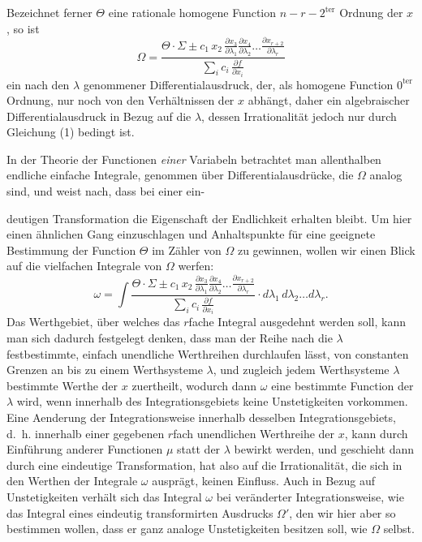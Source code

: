\documentclass{article}
\begin{document}
Bezeichnet ferner $\Theta$ eine rationale homogene Function $n - r - 2^{\text{ter}}$ Ordnung der $x$, so ist
\[
\Omega = \frac{\Theta \cdot \Sigma \pm c_1\, x_2\, \frac{\partial x_3}{\partial \lambda_1} \frac{\partial x_4}{\partial \lambda_2} \dots \frac{\partial x_{r+2}}{\partial \lambda_r}}{\displaystyle\sum_i c_i\, \frac{\partial f}{\partial x_i}}
\]
ein nach den $\lambda$ genommener Differentialausdruck, der, als homogene Function $0^{\text{ter}}$ Ordnung, nur noch von den Verhältnissen der $x$ abhängt, daher ein algebraischer Differentialausdruck in Bezug auf die $\lambda$, dessen Irrationalität jedoch nur durch Gleichung (1) bedingt ist.

In der Theorie der Functionen \emph{einer} Variabeln betrachtet man allenthalben endliche einfache Integrale, genommen über Differentialausdrücke, die $\Omega$ analog sind, und weist nach, dass bei einer ein-

deutigen Transformation die Eigenschaft der Endlichkeit erhalten bleibt. Um hier einen ähnlichen Gang einzuschlagen und Anhaltspunkte für eine geeignete Bestimmung der Function $\Theta$ im Zähler von $\Omega$ zu gewinnen, wollen wir einen Blick auf die vielfachen Integrale von $\Omega$ werfen:
\[
\omega = \int \frac{\Theta \cdot \Sigma \pm c_1\, x_2\, \frac{\partial x_3}{\partial \lambda_1} \frac{\partial x_4}{\partial \lambda_2} \dots \frac{\partial x_{r+2}}{\partial \lambda_r}}{\displaystyle\sum_i c_i\, \frac{\partial f}{\partial x_i}} \cdot d\lambda_1\, d\lambda_2 \dots d\lambda_r .
\]
Das Werthgebiet, über welches das $r$fache Integral ausgedehnt werden soll, kann man sich dadurch festgelegt denken, dass man der Reihe nach die $\lambda$ festbestimmte, einfach unendliche Werthreihen durchlaufen lässt, von constanten Grenzen an bis zu einem Werthsysteme $\lambda$, und zugleich jedem Werthsysteme $\lambda$ bestimmte Werthe der $x$ zuertheilt, wodurch dann $\omega$ eine bestimmte Function der $\lambda$ wird, wenn innerhalb des Integrationsgebiets keine Unstetigkeiten vorkommen. Eine Aenderung der Integrationsweise innerhalb desselben Integrationsgebiets, d.~h. innerhalb einer gegebenen $r$fach unendlichen Werthreihe der $x$, kann durch Einführung anderer Functionen $\mu$ statt der $\lambda$ bewirkt werden, und geschieht dann durch eine eindeutige Transformation, hat also auf die Irrationalität, die sich in den Werthen der Integrale $\omega$ ausprägt, keinen Einfluss. Auch in Bezug auf Unstetigkeiten verhält sich das Integral $\omega$ bei veränderter Integrationsweise, wie das Integral eines eindeutig transformirten Ausdrucks $\Omega'$, den wir hier aber so bestimmen wollen, dass er ganz analoge Unstetigkeiten besitzen soll, wie $\Omega$ selbst.
\end{document}
